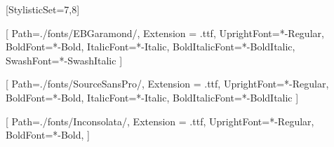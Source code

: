\providecommand{\fontpath}{./fonts}
\usepackage[english]{babel}
\usepackage[math-style=ISO, bold-style=ISO]{unicode-math}
[StylisticSet={7,8}]


\setmainfont{EBGaramond}[
    Path=\fontpath/EBGaramond/,
    Extension = .ttf,
    UprightFont=*-Regular,
    BoldFont=*-Bold,
    ItalicFont=*-Italic,
    BoldItalicFont=*-BoldItalic,
    SwashFont=*-SwashItalic
    ]

\setsansfont{SourceSansPro}[
	Path=\fontpath/SourceSansPro/,
	Extension = .ttf,
    UprightFont=*-Regular,
    BoldFont=*-Bold,
    ItalicFont=*-Italic,
    BoldItalicFont=*-BoldItalic
    ]

\setmonofont{Inconsolata}[
	Path=\fontpath/Inconsolata/,
    Extension = .ttf,
    UprightFont=*-Regular,
    BoldFont=*-Bold,
	]
